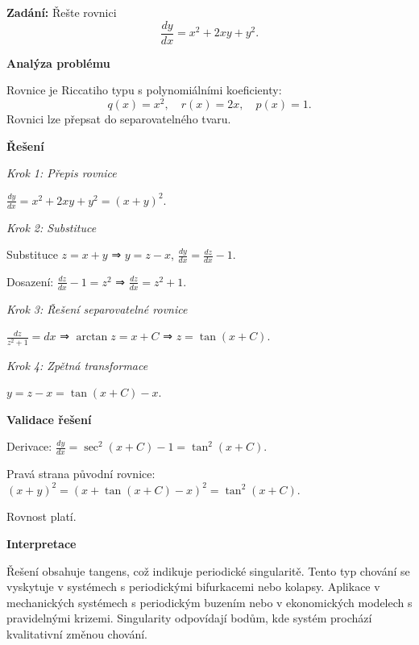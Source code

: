     \vspace{2\baselineskip}
    
    \begin{example}
    \label{ex:l2-riccati-a2-stredni-kvadraticke}
    
    \noindent\textbf{Zadání:} Řešte rovnici
    \[
    \frac{dy}{dx} = x^2 + 2xy + y^2.
    \]
    
    \vspace{1.5\baselineskip}
    
    \noindent\textbf{Analýza problému}
    
    \noindent Rovnice je Riccatiho typu s polynomiálními koeficienty:
    \[
    q(x) = x^2, \quad r(x) = 2x, \quad p(x) = 1.
    \]
    Rovnici lze přepsat do separovatelného tvaru.
    
    \vspace{1.5\baselineskip}
    
    \noindent\textbf{Řešení}
    
    \noindent\textit{Krok 1: Přepis rovnice}
    
    $\frac{dy}{dx} = x^2 + 2xy + y^2 = (x + y)^2$.
    
    \noindent\textit{Krok 2: Substituce}
    
    Substituce $z = x + y$ ⇒ $y = z - x$, $\frac{dy}{dx} = \frac{dz}{dx} - 1$.
    
    Dosazení: $\frac{dz}{dx} - 1 = z^2$ ⇒ $\frac{dz}{dx} = z^2 + 1$.
    
    \noindent\textit{Krok 3: Řešení separovatelné rovnice}
    
    $\frac{dz}{z^2 + 1} = dx$ ⇒ $\arctan z = x + C$ ⇒ $z = \tan(x + C)$.
    
    \noindent\textit{Krok 4: Zpětná transformace}
    
    $y = z - x = \tan(x + C) - x$.
    
    \vspace{1.5\baselineskip}
    
    \noindent\textbf{Validace řešení}
    
    Derivace: $\frac{dy}{dx} = \sec^2(x + C) - 1 = \tan^2(x + C)$.
    
    Pravá strana původní rovnice: $(x + y)^2 = (x + \tan(x + C) - x)^2 = \tan^2(x + C)$.
    
    Rovnost platí.
    
    \vspace{1.5\baselineskip}
    
    \noindent\textbf{Interpretace}
    
    Řešení obsahuje tangens, což indikuje periodické singularitě. Tento typ chování 
    se vyskytuje v systémech s periodickými bifurkacemi nebo kolapsy. Aplikace 
    v mechanických systémech s periodickým buzením nebo v ekonomických modelech 
    s pravidelnými krizemi. Singularity odpovídají bodům, kde systém prochází 
    kvalitativní změnou chování.
    
    \end{example}

